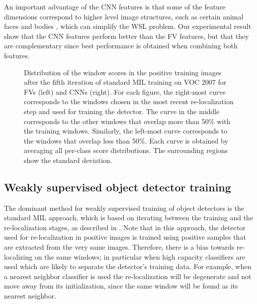 \documentclass[10pt,journal,cspaper,final,twocolumn,compsoc]{./IEEEtran}
\begin{document}
An important advantage of the CNN features is that some of
the feature dimensions correspond to higher level image
structures, such as certain animal faces and bodies
\cite{girshick14cvpr}, which can simplify the WSL problem.
Our experimental result show that the CNN features perform better
than the FV features, but that they are complementary since best performance is obtained when combining both features.

\begin{figure}
\def\myfig#1{\texttt{[image: \#1]}}
\begin{center}
\subfloat[Fisher vectors\label{fig:scorehist:FV}]{%
    \myfig{journal/scorehistogram/2007+standardMIL}
}
\subfloat[CNN features\label{fig:scorehist:CNN}]{%
    \myfig{journal/scorehistogram/journal/2007+standardMIL+CNNonly}
}
\end{center}
\vspace{-1mm}
\caption{Distribution of the window scores in the positive training images after the
fifth iteration of standard MIL training on VOC 2007 for FVs (left) and CNNs (right). 
For each figure, the right-most curve  
corresponds to the windows  chosen in the most recent re-localization step
and used for training the detector.
The curve in the middle corresponds to the other windows
that overlap more than 50\% with the
training windows. Similarly, the left-most curve
corresponds to the windows that overlap less than 50\%.
Each curve is obtained by averaging all per-class score distributions. 
The surrounding regions show the standard deviation.}
\label{fig:scorehist}
\vspace{-1mm}
\end{figure}\subsection{Weakly supervised object detector training}\label{sec:training}

The dominant method for weakly supervised training of
object detectors is the standard MIL approach, which is
based on iterating between the training and the
re-localization stages, as described in .
Note that in this approach, the detector used for
re-localization in positive images is trained using
positive samples that are extracted from the very same
images.  Therefore, there is a bias towards re-localizing
on the same windows; in particular when high capacity
classifiers are used which are likely to separate the
detector's training data.  For example, when a nearest
neighbor classifier is used the re-localization will be
degenerate and not move away from its initialization,
since the same window will be found as its nearest
neighbor.  
\end{document}
